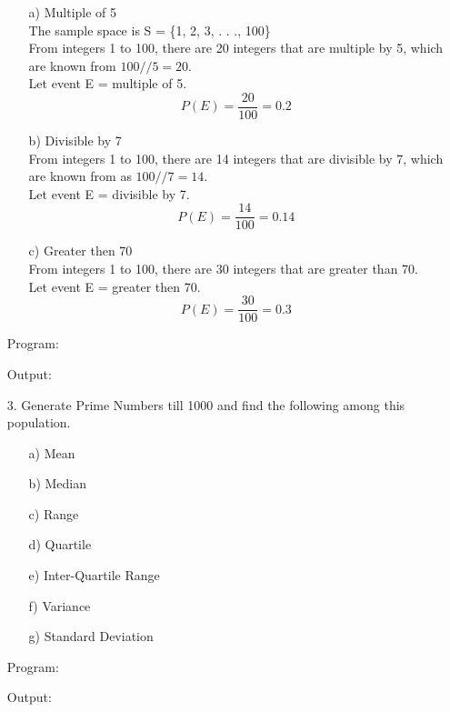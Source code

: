 \documentclass[a4paper,11pt,openright]{report}
\begin{document}
\begin{enumerate}
\begin{enumerate}
\item[a)] Multiple of 5 \\
The sample space is S = \{1, 2, 3, . . ., 100\} \\
From integers 1 to 100, there are 20 integers that are multiple by 5, which are known from
$100//5 = 20$. \\
Let event E = multiple of 5. 
\begin{equation*}
P(E) = \frac{20}{100} = 0.2
\end{equation*}

\item[b)] Divisible by 7 \\
From integers 1 to 100, there are 14 integers that are divisible by 7, which are known from
as $100//7 = 14$. \\
Let event E = divisible by 7.
\begin{equation*}
P(E) = \frac{14}{100} = 0.14
\end{equation*}

\item[c)] Greater then 70 \\
From integers 1 to 100, there are 30 integers that are greater than 70. \\
Let event E = greater then 70. \\
\begin{equation*}
P(E) = \frac{30}{100} = 0.3
\end{equation*}
\end{enumerate}


Program:

\vspace{5px}

\pagebreak

Output:

\vspace{10px}

\pagebreak

\item[3.] Generate Prime Numbers till 1000 and find the following among this population.
\begin{enumerate}
\item[a)] Mean
\item[b)] Median
\item[c)] Range
\item[d)] Quartile
\item[e)] Inter-Quartile Range
\item[f)] Variance
\item[g)] Standard Deviation
\end{enumerate}

Program: 


\vspace{5px}

\pagebreak

Output:

\end{enumerate}
\end{document}
